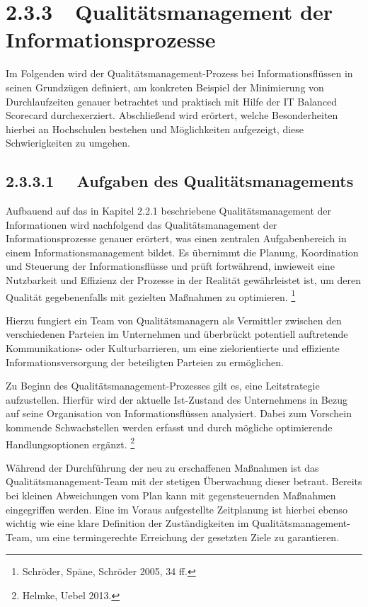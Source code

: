 \documentclass{article}
\title{}
\begin{document}
\section[2.3.3\ \ Qualitätsmanagement der Informationsprozesse]{2.3.3\ \ Qualitätsmanagement der Informationsprozesse}
Im Folgenden wird der Qualitätsmanagement-Prozess bei Informationsflüssen in seinen Grundzügen definiert, am konkreten
Beispiel der Minimierung von Durchlaufzeiten genauer betrachtet und praktisch mit Hilfe der IT Balanced Scorecard
durchexerziert. Abschließend wird erörtert, welche Besonderheiten hierbei an Hochschulen bestehen und Möglichkeiten
aufgezeigt, diese Schwierigkeiten zu umgehen. 

\subsection[2.3.3.1 \ \ Aufgaben des Qualitätsmanagements ]{2.3.3.1 \ \ Aufgaben des Qualitätsmanagements }
Aufbauend auf das in Kapitel 2.2.1 beschriebene Qualitätsmanagement der Informationen wird nachfolgend das
Qualitätsmanagement der Informationsprozesse genauer erörtert, was einen zentralen Aufgabenbereich in einem
Informationsmanagement bildet. Es übernimmt die Planung, Koordination und Steuerung der Informationsflüsse und prüft
fortwährend, inwieweit eine Nutzbarkeit und Effizienz der Prozesse in der Realität gewährleistet ist, um deren Qualität
gegebenenfalls mit gezielten Maßnahmen zu optimieren. \footnote{Schröder, Späne, Schröder 2005, 34 ff.}


\bigskip

Hierzu fungiert ein Team von Qualitätsmanagern als Vermittler zwischen den verschiedenen Parteien im Unternehmen und
überbrückt potentiell auftretende Kommunikations- oder Kulturbarrieren, um eine zielorientierte und effiziente
Informationsversorgung der beteiligten Parteien zu ermöglichen. 


\bigskip

Zu Beginn des Qualitätsmanagement-Prozesses gilt es, eine Leitstrategie aufzustellen. Hierfür wird der aktuelle
Ist-Zustand des Unternehmens in Bezug auf seine Organisation von Informationsflüssen analysiert. Dabei zum Vorschein
kommende Schwachstellen werden erfasst und durch mögliche optimierende Handlungsoptionen ergänzt. \footnote{Helmke,
Uebel 2013.}


\bigskip

Während der Durchführung der neu zu erschaffenen Maßnahmen ist das Qualitätsmanagement-Team mit der stetigen Überwachung
dieser betraut. Bereits bei kleinen Abweichungen vom Plan kann mit gegensteuernden Maßnahmen eingegriffen werden. Eine
im Voraus aufgestellte Zeitplanung ist hierbei ebenso wichtig wie eine klare Definition der Zuständigkeiten im
Qualitätsmanagement-Team, um eine termingerechte Erreichung der gesetzten Ziele zu garantieren.
\end{document}
